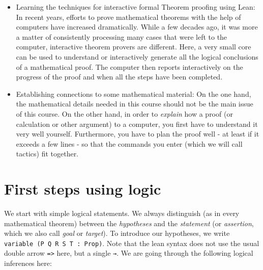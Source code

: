 \documentclass{memoir}
\begin{document}
\begin{itemize}
\item Learning the techniques for interactive formal Theorem proofing using Lean: In recent years, efforts to prove mathematical theorems with the help of computers have increased dramatically. While a few decades ago, it was more a matter of consistently processing many cases that were left to the computer, interactive theorem provers are different. Here, a very small core can be used to understand or interactively generate all the logical conclusions of a mathematical proof. The computer then reports interactively on the progress of the proof and when all the steps have been completed.\item Establishing connections to some mathematical material: On the one hand, the mathematical details needed in this course should not be the main issue of this course. On the other hand, in order to \emph{explain} how a proof (or calculation or other argument) to a computer, you first have to understand it very well yourself. Furthermore, you have to plan the proof well - at least if it exceeds a few lines - so that the commands you enter (which we will call tactics) fit together.
\end{itemize}





\chapter{First steps using logic}

We start with simple logical statements. We always distinguish (as in every mathematical theorem) between the \emph{hypotheses} and the \emph{statement} (or \emph{assertion}, which we also call \emph{goal} or \emph{target}). To introduce our hypotheses, we write \Verb|variable (P Q R S T : Prop)|. Note that the lean syntax does not use the usual double arrow \Verb|=>| here, but a single \Verb|→|. We are going through the following logical inferences here:
\end{document}
